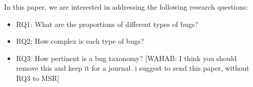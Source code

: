 In this paper,  we are interested in addressing the following research questions:

\begin{itemize}
	\item RQ1: What are the proportions of different types of bugs?
	\item RQ2: How complex is each type of bugs?
	\item RQ3: How pertinent is a bug taxonomy?  [WAHAB: I think you should remove this and keep it for a journal. i suggest to send this paper, without RQ3 to MSR]
\end{itemize}
